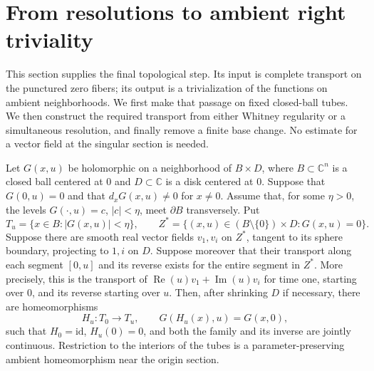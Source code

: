 \section{From resolutions to ambient right triviality}
\label{sec:ambient-lifting}

This section supplies the final topological step. Its input is complete
transport on the punctured zero fibers; its output is a trivialization of
the functions on ambient neighborhoods. We first make that passage on fixed
closed-ball tubes. We then construct the required transport from either
Whitney regularity or a simultaneous resolution, and finally remove a finite
base change. No estimate for a vector field at the singular section is needed.

\begin{lemma}
\label{lem:ambient-tube}
Let $G(x,u)$ be holomorphic on a neighborhood of
$B\times D$, where $B\subset\mathbb C^n$ is a closed ball centered at $0$
and $D\subset\mathbb C$ is a disk centered at $0$.
Suppose that $G(0,u)=0$ and that $d_xG(x,u)\ne0$ for $x\ne0$.
Assume that, for some $\eta>0$, the levels
$G(\cdot,u)=c$, $|c|<\eta$, meet $\partial B$ transversely.
Put
\[
 T_u=\{x\in B:|G(x,u)|<\eta\},\qquad
 Z^*=\{(x,u)\in(B\setminus\{0\})\times D:G(x,u)=0\}.
\]
Suppose there are smooth real vector fields $v_1,v_i$ on $Z^*$,
tangent to its sphere boundary, projecting to $1,i$ on $D$.
Suppose moreover that their transport along each segment $[0,u]$
and its reverse exists for the entire segment in $Z^*$.
More precisely, this is the transport of
$\operatorname{Re}(u)v_1+\operatorname{Im}(u)v_i$ for time one,
starting over $0$, and its reverse starting over $u$.
Then, after shrinking $D$ if necessary, there are homeomorphisms
\[
 H_u:T_0\longrightarrow T_u,
 \qquad G(H_u(x),u)=G(x,0),
\]
such that $H_0=\mathrm{id}$, $H_u(0)=0$, and both the family and its
inverse are jointly continuous. Restriction to the interiors of the tubes
is a parameter-preserving ambient homeomorphism near the origin section.
\end{lemma}

